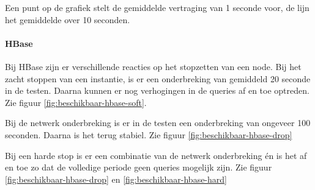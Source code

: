 Een punt op de grafiek stelt de gemiddelde vertraging van 1 seconde voor, de lijn het gemiddelde over 10 seconden. 

\paragraph{HBase}
Bij HBase zijn er verschillende reacties op het stopzetten van een node. Bij het zacht stoppen van een instantie, is er een onderbreking van gemiddeld 20 seconde in de testen. Daarna kunnen er nog verhogingen in de queries af en toe optreden. Zie figuur \ref{fig:beschikbaar-hbase-soft}. 

Bij de netwerk onderbreking is er in de testen een onderbreking van ongeveer 100 seconden. Daarna is het terug stabiel. Zie figuur \ref{fig:beschikbaar-hbase-drop}

Bij een harde stop is er een combinatie van de netwerk onderbreking én is het af en toe zo dat de volledige periode geen queries mogelijk zijn. Zie figuur \ref{fig:beschikbaar-hbase-drop} en \ref{fig:beschikbaar-hbase-hard}

